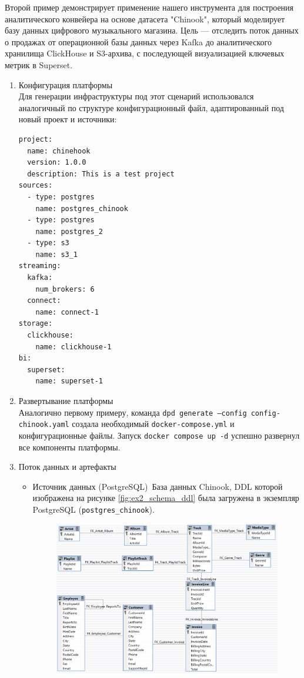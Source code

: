 Второй пример демонстрирует применение нашего инструмента для построения аналитического конвейера на основе датасета "Chinook"\cite{chinook}, который моделирует базу данных цифрового музыкального магазина. Цель — отследить поток данных о продажах от операционной базы данных через Kafka до аналитического хранилища ClickHouse и S3-архива, с последующей визуализацией ключевых метрик в Superset.

\begin{enumerate}[1.]
  \item Конфигурация платформы\\
        Для генерации инфраструктуры под этот сценарий использовался аналогичный по структуре конфигурационный файл, адаптированный под новый проект и источники:
        \begin{verbatim}
project:
  name: chinehook
  version: 1.0.0
  description: This is a test project
sources:
  - type: postgres
    name: postgres_chinook
  - type: postgres
    name: postgres_2
  - type: s3
    name: s3_1
streaming:
  kafka:
    num_brokers: 6
  connect:
    name: connect-1
storage:
  clickhouse:
    name: clickhouse-1 
bi:
  superset:
    name: superset-1
    \end{verbatim}
  \item{Развертывание платформы}\\
        Аналогично первому примеру, команда \texttt{dpd generate --config config-chinook.yaml} создала необходимый \texttt{docker-compose.yml} и конфигурационные файлы. Запуск \texttt{docker compose up -d} успешно развернул все компоненты платформы.
  \item{Поток данных и артефакты}
        \begin{itemize}
          \item Источник данных (PostgreSQL)\
                База данных Chinook, DDL которой изображена на рисунке \ref{fig:ex2_schema_ddl} была загружена в экземпляр PostgreSQL (\texttt{postgres\_chinook}).
                \begin{figure}[h]
                  \center
                  \includegraphics [scale=0.5] {my_folder/images/ex2_schema_ddl}

\end{figure}
\end{itemize}
\end{enumerate}
